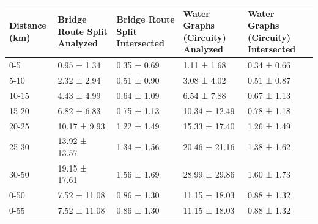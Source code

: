 \begin{tabular}{lllll}
\toprule
Distance (km) & Bridge Route Split Analyzed & Bridge Route Split Intersected & Water Graphs (Circuity) Analyzed & Water Graphs (Circuity) Intersected \\
\midrule
0-5 & 0.95 ± 1.34 & 0.35 ± 0.69 & 1.11 ± 1.68 & 0.34 ± 0.66 \\
5-10 & 2.32 ± 2.94 & 0.51 ± 0.90 & 3.08 ± 4.02 & 0.51 ± 0.87 \\
10-15 & 4.43 ± 4.99 & 0.64 ± 1.09 & 6.54 ± 7.88 & 0.67 ± 1.13 \\
15-20 & 6.82 ± 6.83 & 0.75 ± 1.13 & 10.34 ± 12.49 & 0.78 ± 1.18 \\
20-25 & 10.17 ± 9.93 & 1.22 ± 1.49 & 15.33 ± 17.40 & 1.26 ± 1.49 \\
25-30 & 13.92 ± 13.57 & 1.34 ± 1.56 & 20.46 ± 21.16 & 1.38 ± 1.62 \\
30-50 & 19.15 ± 17.61 & 1.56 ± 1.69 & 28.99 ± 29.86 & 1.60 ± 1.73 \\
0-50 & 7.52 ± 11.08 & 0.86 ± 1.30 & 11.15 ± 18.03 & 0.88 ± 1.32 \\
0-55 & 7.52 ± 11.08 & 0.86 ± 1.30 & 11.15 ± 18.03 & 0.88 ± 1.32 \\
\bottomrule
\end{tabular}
